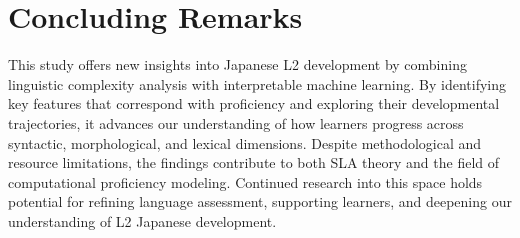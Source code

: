 \section{Concluding Remarks}

This study offers new insights into Japanese L2 development by combining linguistic complexity analysis with
interpretable machine learning. By identifying key features that correspond with proficiency and exploring their
developmental trajectories, it advances our understanding of how learners progress across syntactic, morphological,
and lexical dimensions. Despite methodological and resource limitations, the findings contribute to both SLA theory
and the field of computational proficiency modeling. Continued research into this space holds potential for
refining language assessment, supporting learners, and deepening our understanding of L2 Japanese development.
